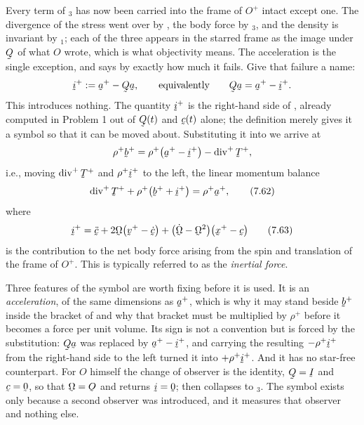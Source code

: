 Every term of $_{3}$ has now been carried into the frame of
$O^{+}$ intact except one. The divergence of the stress went over by
, the body force by $_{3}$, and the density is
invariant by $_{1}$; each of the three appears in the starred
frame as the image under $\bQ$ of what $O$ wrote, which is what
objectivity means. The acceleration is the single exception, and
 says by exactly how much it fails. Give that failure a name:
\begin{equation*}
   \vek{i}^{+}:=\ba^{+}-\bQ\ba ,
   \qquad\text{equivalently}\qquad
   \bQ\ba=\ba^{+}-\vek{i}^{+}.
\end{equation*}
This introduces nothing. The quantity $\vek{i}^{+}$ is the right-hand
side of , already computed in Problem 1 out of $\bQ(t)$ and
$\bc(t)$ alone; the definition merely gives it a symbol so that it can be
moved about. Substituting it into  we arrive at
\[
   \rho^{+}\bb^{+}=\rho^{+}\big(\ba^{+}-\vek{i}^{+}\big)
   -\dvg^{+}\bT^{+},
\]
i.e., moving $\dvg^{+}\bT^{+}$ and $\rho^{+}\vek{i}^{+}$ to the left, the
linear momentum balance
\begin{equation}
   \dvg^{+}\bT^{+}+\rho^{+}\big(\bb^{+}+\vek{i}^{+}\big)=\rho^{+}\ba^{+},
   \tag{7.62}\label{eq:7.62}
\end{equation}
where
\begin{equation}
   \vek{i}^{+}=\ddot\bc+2\bOm\big(\bv^{+}-\dot\bc\big)
   +\big(\dot\bOm-\bOm^{2}\big)\big(\bx^{+}-\bc\big)
   \tag{7.63}\label{eq:7.63}
\end{equation}
is the contribution to the net body force arising from the spin and
translation of the frame of $O^{+}$. This is typically referred to as the
\emph{inertial force}.

Three features of the symbol are worth fixing before it is used. It is an
\emph{acceleration}, of the same dimensions as $\ba^{+}$, which is why it
may stand beside $\bb^{+}$ inside the bracket of  and why that
bracket must be multiplied by $\rho^{+}$ before it becomes a force per
unit volume. Its sign is not a convention but is forced by the
substitution: $\bQ\ba$ was replaced by $\ba^{+}-\vek{i}^{+}$, and
carrying the resulting $-\rho^{+}\vek{i}^{+}$ from the right-hand side to
the left turned it into $+\rho^{+}\vek{i}^{+}$. And it has no star-free
counterpart. For $O$ himself the change of observer is the identity,
$\bQ=\I$ and $\bc=\bze$, so that $\bOm=\Ob$ and  returns
$\vek{i}=\bze$;  then collapses to $_{3}$. The symbol
exists only because a second observer was introduced, and it measures
that observer and nothing else.

